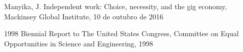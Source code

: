 \documentclass[
12pt,		%
openright,	%
twoside,  %
a4paper,			%
chapter=TITLE,		%
english,			%
french,				%
spanish,			%
brazil				%
]{USPSC-classe/USPSC}
\begin{document}
\begin{flushleft}
\begin{flushleft}
\begin{flushleft}
\begin{flushleft}
\begin{flushleft}
\begin{flushleft}
\begin{flushleft}
\begin{flushleft}
\begin{flushleft}
\begin{flushleft}
[Manyika, 2016] Manyika, J. Independent work: Choice, necessity, and the gig economy, Mackinsey Global Institute, 10 de outubro de 2016
\end{flushleft}


\end{flushleft}


\end{flushleft}


\end{flushleft}


\end{flushleft}


\end{flushleft}


\end{flushleft}


\end{flushleft}


\end{flushleft}


\end{flushleft}


\begin{flushleft}
\begin{flushleft}
\begin{flushleft}
\begin{flushleft}
\begin{flushleft}
\begin{flushleft}
\begin{flushleft}
\begin{flushleft}
\begin{flushleft}
\begin{flushleft}
[CONGRESS, 1998] 1998 Biennial Report to The United States Congress, Committee on Equal Opportunities in Science and Engineering, 1998
\end{flushleft}


\end{flushleft}


\end{flushleft}


\end{flushleft}


\end{flushleft}


\end{flushleft}


\end{flushleft}


\end{flushleft}


\end{flushleft}


\end{flushleft}
\end{document}

